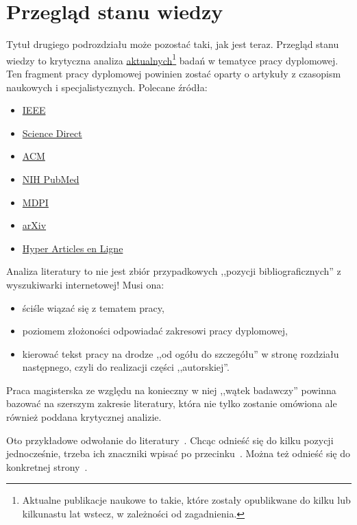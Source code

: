 \section{Przegląd stanu wiedzy}

Tytuł drugiego podrozdziału może pozostać taki, jak jest teraz. Przegląd stanu wiedzy to krytyczna analiza \underline{aktualnych}\footnote{Aktualne publikacje naukowe to takie, które zostały opublikwane do kilku lub kilkunastu lat wstecz, w zależności od zagadnienia.} badań w tematyce pracy dyplomowej. Ten fragment pracy dyplomowej powinien zostać oparty o artykuły z czasopism naukowych i specjalistycznych. Polecane źródła:

\begin{itemize}
	\item \href{http://eczyt.bg.pw.edu.pl/han/ieee-import/}{IEEE}
	\item \href{http://eczyt.bg.pw.edu.pl/han/ScienceDirectOnLine}{Science Direct}
	\item \href{http://eczyt.bg.pw.edu.pl/han/ACMDigitalLibrary}{ACM}
	\item \href{https://pubmed.ncbi.nlm.nih.gov/}{NIH PubMed}
	\item \href{https://www.mdpi.com/}{MDPI}
	\item \href{https://arxiv.org/}{arXiv}
	\item \href{https://hal.science/}{Hyper Articles en Ligne}
\end{itemize}

Analiza literatury to nie jest zbiór przypadkowych ,,pozycji bibliograficznych'' z wyszukiwarki internetowej! Musi ona:

\begin{itemize}
	\item ściśle wiązać się z tematem pracy,
	\item poziomem złożoności odpowiadać zakresowi pracy dyplomowej, 
	\item kierować tekst pracy na drodze ,,od ogółu do szczegółu'' w stronę rozdziału następnego, czyli do realizacji części ,,autorskiej''.
\end{itemize}

Praca magisterska ze względu na konieczny w niej ,,wątek badawczy'' powinna bazować na szerszym zakresie literatury, która nie tylko zostanie omówiona ale również poddana krytycznej analizie.

Oto przykładowe odwołanie do literatury~\cite{fowler2009}. Chcąc odnieść się do kilku pozycji jednocześnie, trzeba ich znaczniki wpisać po przecinku~\cite{maxwell1865,leksinski1995}. Można też odnieść się do konkretnej strony~\cite[s.~38]{leksinski1995}. 

